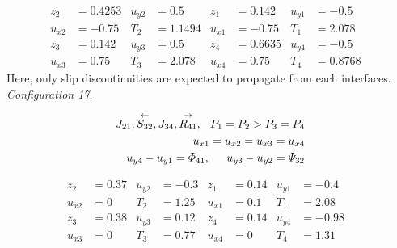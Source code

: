 \documentclass{rsproca}%
\begin{document}
\begin{align*}
z_2	&=0.4253& 	u_{y2}&=0.5& 	z_1&=0.142& 		u_{y1}&=-0.5& \\
u_{x2}&=-0.75&	T_2&=1.1494& 	u_{x1}&=-0.75& 	T_1&=2.078&		\\
z_3&=0.142&			u_{y3}&=0.5& 	z_4&=0.6635& 		u_{y4}&=-0.5&	\\
u_{x3}&=0.75&		T_3&=2.078& 	u_{x4}&=0.75& 	T_4&=0.8768&
\end{align*}
Here, only slip discontinuities are expected to propagate from each interfaces. \\

{\em Configuration 17}.

\begin{eqnarray*}
J_{21},\stackrel{\leftarrow}{S_{32}},J_{34},\stackrel{\rightarrow}{R_{41}},\hspace{0.1in}P_1=P_2>P_3=P_4&\\
u_{x1}=u_{x2}=u_{x3}=u_{x4}\\
u_{y4}-u_{y1}=\Phi_{41},\hspace{0.2in}u_{y3}-u_{y2}=\Psi_{32}&
\label{con17setup}
\end{eqnarray*}

\begin{align*}
z_2		&=0.37& u_{y2}	&=-0.3& z_1		 	&=0.14& 	u_{y1}	&=-0.4& 	\\
u_{x2}&=0& 		T_2			&=1.25& u_{x1}	&=0.1& 		T_1			&=2.08&		\\
z_3		&=0.38& u_{y3}	&=0.12& z_4			&=0.14&		u_{y4}	&=-0.98& 	\\
u_{x3}&=0& 		T_3			&=0.77& u_{x4}	&=0& 			T_4			&=1.31&		\\
\end{align*}
\end{document}
